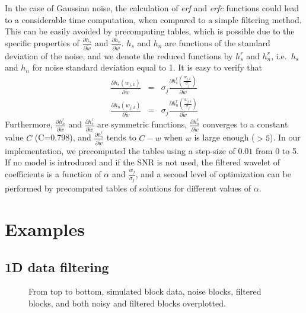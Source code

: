In the case of Gaussian noise, the 
calculation of {\em erf} and {\em erfc} functions could lead to a 
considerable
time computation, when compared to a simple filtering method. This can
be easily avoided by precomputing tables, which is possible due to 
the specific properties of 
$\frac{\partial h_s}{\partial \tilde  w}$ and $\frac{\partial h_n}{\partial \tilde  w}$.
$h_s$ and $h_n$ are functions of the standard deviation of the noise, and
we denote the reduced functions by $h^r_s$ and $h^r_n$, 
i.e.\ $h_s$ and $h_n$ for
noise standard deviation equal to 1. It is easy to verify that
\begin{eqnarray}
\frac{\partial h_s(w_{j,k})}{\partial \tilde  w} & = & \sigma_j \frac{\partial h^r_s(\frac{w_{j,k}}{\sigma_j})}{\partial \tilde  w} \\
\frac{\partial h_n(w_{j,k})}{\partial  \tilde w} & = & \sigma_j \frac{\partial h^r_n(\frac{w_{j,k}}{\sigma_j})}{\partial  \tilde w} 
\end{eqnarray}
Furthermore,  $\frac{\partial h^r_n}{\partial \tilde w}$ and  $\frac{\partial h^r_s}{\partial \tilde w}$   
are symmetric functions, $\frac{\partial h^r_n}{\partial \tilde w}$
converges to a constant value $C$ (C=0.798), and $\frac{\partial h^r_s}{\partial \tilde  w}$
tends to $C-w$ when $w$ is large enough ($>5$).
In our implementation, we precomputed the tables using a step-size of $0.01$
from 0 to 5. If no model is introduced and if the SNR is not used, the filtered
wavelet of coefficients is a function of $\alpha$ and $\frac{w_j}{\sigma_j}$,
and a second level of optimization can be performed by precomputed tables
of solutions for different values of $\alpha$.
 

\section{Examples}
\subsection{1D data filtering}
\begin{figure}[htb]
\centerline{
\vbox{ 
}}
\caption{From top to bottom, simulated block data, noise blocks, filtered blocks,
and both noisy and filtered blocks overplotted.}
\label{fig_1d_block}
\end{figure}

